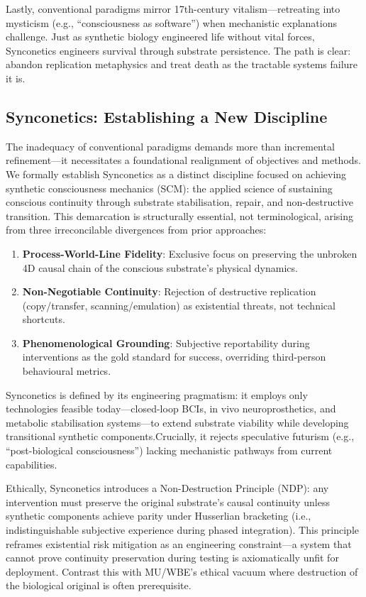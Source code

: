\documentclass[10pt]{article}
\begin{document}
\begin{sloppypar}
  Lastly, conventional paradigms mirror 17th-century vitalism—retreating into mysticism (e.g., “consciousness as software”) when mechanistic explanations challenge. Just as synthetic biology engineered life without vital forces, Synconetics engineers survival through substrate persistence. The path is clear: abandon replication metaphysics and treat death as the tractable systems failure it is.

  \subsection{Synconetics: Establishing a New Discipline}
  \label{sec:new-discipline}

  The inadequacy of conventional paradigms demands more than incremental refinement—it necessitates a foundational realignment of objectives and methods. We formally establish Synconetics as a distinct discipline focused on achieving synthetic consciousness mechanics (SCM): the applied science of sustaining conscious continuity through substrate stabilisation, repair, and non-destructive transition. This demarcation is structurally essential, not terminological, arising from three irreconcilable divergences from prior approaches:

  \begin{enumerate}
    \item \textbf{Process-World-Line Fidelity}: Exclusive focus on preserving the unbroken 4D causal chain of the conscious substrate’s physical dynamics.
    \item \textbf{Non-Negotiable Continuity}: Rejection of destructive replication (copy/transfer, scanning/emulation) as existential threats, not technical shortcuts.
    \item \textbf{Phenomenological Grounding}: Subjective reportability during interventions as the gold standard for success, overriding third-person behavioural metrics.
  \end{enumerate}

  Synconetics is defined by its engineering pragmatism: it employs only technologies feasible today—closed-loop BCIs, in vivo neuroprosthetics, and metabolic stabilisation systems—to extend substrate viability while developing transitional synthetic components.Crucially, it rejects speculative futurism (e.g., “post-biological consciousness”) lacking mechanistic pathways from current capabilities.

  Ethically, Synconetics introduces a Non-Destruction Principle (NDP): any intervention must preserve the original substrate’s causal continuity unless synthetic components achieve parity under Husserlian bracketing (i.e., indistinguishable subjective experience during phased integration). This principle reframes existential risk mitigation as an engineering constraint—a system that cannot prove continuity preservation during testing is axiomatically unfit for deployment. Contrast this with MU/WBE’s ethical vacuum where destruction of the biological original is often prerequisite.


\end{sloppypar}
\end{document}
